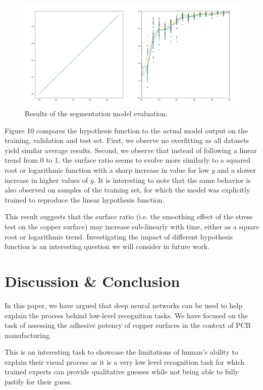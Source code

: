 \documentclass[10pt,twocolumn,letterpaper]{article}
\begin{document}
\begin{figure}[h]
	\centering
	\includegraphics[width=0.9\linewidth]{"./figures/Figure10"}
	\caption{
		Results of the segmentation model evaluation.
	}
\end{figure}

Figure 10 compares the hypothesis function to the actual model output on the training, 
validation and test set.
First, we observe no overfitting as all datasets yield similar average results.
Second, we observe that instead of following a linear trend from 0 to 1, 
the surface ratio seems to evolve more similarly to a squared root or logarithmic function
with a sharp increase in value for low $y$ and a slower increase in higher values of $y$.
It is interesting to note that the same behavior is also observed on samples of the training set, 
for which the model was explicitly trained to reproduce the linear hypothesis function.

This result suggests that the surface ratio (i.e. the smoothing effect of the stress test on the copper surface) may increase sub-linearly with time, either as a square root or logarithmic trend.
Investigating the impact of different hypothesis function is an 
interesting question we will consider in future work.

\section{Discussion \& Conclusion}


In this paper, we have argued that deep neural networks can be used to 
help explain the process behind low-level recognition tasks.
We have focused on the task of assessing the adhesive potency 
of copper surfaces in the context of PCB manufacturing.

This is an interesting task to showcase the limitations of human's ability to explain their visual process
as it is a very low level recognition task for which trained experts can provide qualitative guesses while
not being able to fully justify for their guess.
\end{document}
